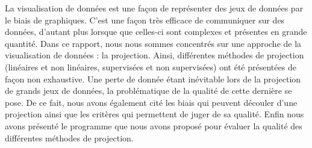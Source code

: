 
La visualisation de données est une façon de représenter des jeux de données par le biais de graphiques.
C'est une façon très efficace de communiquer sur des données, d'autant plus lorsque que celles-ci sont complexes et présentes en grande quantité.
Dans ce rapport, nous nous sommes concentrés sur une approche de la visualisation de données : la projection. 
Ainsi, différentes méthodes de projection (linéaires et non linéaires, supervisées et non supervisées) ont été présentées de façon non exhaustive. 
Une perte de donnée étant inévitable lors de la projection de grands jeux de données, la problématique de la qualité de cette dernière se pose. 
De ce fait, nous avons également cité les biais qui peuvent découler d'une projection ainsi que les critères qui permettent de juger de sa qualité.
Enfin nous avons présenté le programme que nous avons proposé pour évaluer la qualité des différentes méthodes de projection.

